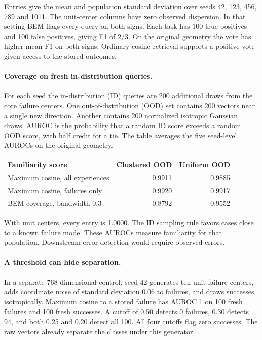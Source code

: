 Entries give the mean and population standard deviation over seeds 42, 123,
456, 789 and 1011. The unit-center columns have zero observed dispersion.
In that setting BEM flags every query on both signs. Each task has 100 true
positives and 100 false positives, giving F1 of $2/3$. On the original
geometry the vote has higher mean F1 on both signs. Ordinary cosine retrieval
supports a positive vote given access to the stored outcomes.

\paragraph{Coverage on fresh in-distribution queries.}
For each seed the in-distribution (ID) queries are 200 additional draws from
the core failure centers. One out-of-distribution (OOD) set contains 200
vectors near a single new direction. Another contains 200 normalized
isotropic Gaussian draws. AUROC is the probability that a random ID score
exceeds a random OOD score, with half credit for a tie. The table averages
the five seed-level AUROCs on the original geometry.

\begin{center}
\begin{tabular}{lrr}
\toprule
Familiarity score & Clustered OOD & Uniform OOD \\
\midrule
Maximum cosine, all experiences & 0.9911 & 0.9885 \\
Maximum cosine, failures only   & 0.9920 & 0.9917 \\
BEM coverage, bandwidth 0.3     & 0.8792 & 0.9552 \\
\bottomrule
\end{tabular}
\end{center}

With unit centers, every entry is 1.0000. The ID sampling rule favors cases
close to a known failure mode. These AUROCs measure familiarity for that
population. Downstream error detection would require observed errors.

\paragraph{A threshold can hide separation.}
In a separate 768-dimensional control, seed 42 generates ten unit failure
centers, adds coordinate noise of standard deviation 0.06 to failures, and
draws successes isotropically. Maximum cosine to a stored failure has AUROC
1 on 100 fresh failures and 100 fresh successes. A cutoff of 0.50 detects
0 failures, 0.30 detects 94, and both 0.25 and 0.20 detect all 100. All four
cutoffs flag zero successes. The raw vectors already separate the classes
under this generator.

